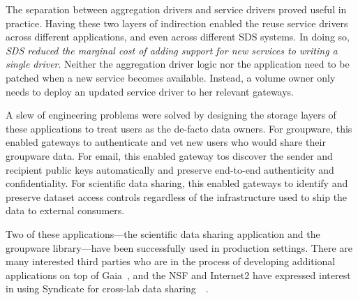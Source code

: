 The separation between aggregation drivers and service drivers proved useful in
practice.  Having these two layers of indirection enabled the reuse service
drivers across different applications, and even across different SDS systems.
In doing so, \emph{SDS reduced the marginal cost of adding support for new
services to writing a single driver}.
Neither the aggregation driver logic nor the application need to be
patched when a new service becomes available.  Instead, a volume owner only
needs to deploy an updated service driver to her relevant gateways.

A slew of engineering problems were solved by
designing the storage layers of these applications to treat users as the
de-facto data owners.
For groupware, this enabled gateways to authenticate and vet new users who would
share their groupware data.  For email, this enabled gateway tos discover the
sender and recipient public keys automatically and preserve end-to-end
authenticity and confidentiality.  For scientific data sharing,
this enabled gateways to identify and preserve dataset access controls regardless of the infrastructure used
to ship the data to external consumers.

Two of these applications---the scientific data sharing application and the
groupware library---have been successfully used in production settings.
There are many interested third parties who are in the process of developing
additional applications on top of Gaia~\cite{blockstack-app-fund}, and the NSF
and Internet2 have expressed interest in using Syndicate for cross-lab data
sharing~\cite{nsf-grant}~\cite{conversation-internet2}.
